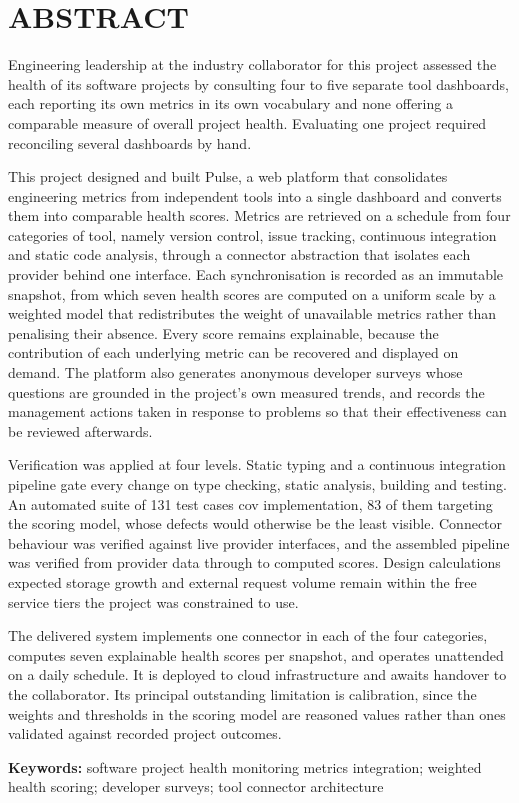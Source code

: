 \chapter*{ABSTRACT}

Engineering leadership at the industry collaborator for this project assessed the
health of its software projects by consulting four to five separate tool
dashboards, each reporting its own metrics in its own vocabulary and none
offering a comparable measure of overall project health. Evaluating one project
required reconciling several dashboards by hand.

This project designed and built Pulse, a web platform that consolidates
engineering metrics from independent tools into a single dashboard and converts
them into comparable health scores. Metrics are retrieved on a schedule from four
categories of tool, namely version control, issue tracking, continuous
integration and static code analysis, through a connector abstraction that
isolates each provider behind one interface. Each synchronisation is recorded as
an immutable snapshot, from which seven health scores are computed on a uniform
scale by a weighted model that redistributes the weight of unavailable metrics
rather than penalising their absence. Every score remains explainable, because
the contribution of each underlying metric can be recovered and displayed on
demand. The platform also generates anonymous developer surveys whose
questions are grounded in the project's own measured trends, and records the
management actions taken in response to problems so that their effectiveness can
be reviewed afterwards.

Verification was applied at four levels. Static typing and a continuous
integration pipeline gate every change on type checking, static analysis,
building and testing. An automated suite of 131 test cases cov
implementation, 83 of them targeting the scoring model, whose defects would
otherwise be the least visible. Connector behaviour was verified
against live provider interfaces, and the assembled pipeline was verified from
provider data through to computed scores. Design calculations
expected storage growth and external request volume remain within the free
service tiers the project was constrained to use.

The delivered system implements one connector in each of the four
categories, computes seven explainable health scores per snapshot, and operates
unattended on a daily schedule. It is deployed to cloud infrastructure and awaits
handover to the collaborator. Its principal outstanding limitation is
calibration, since the weights and thresholds in the scoring model are reasoned
values rather than ones validated against recorded project outcomes.

\vspace{12pt}
\noindent\textbf{Keywords:} software project health monitoring
metrics integration; weighted health scoring; developer surveys;
tool connector architecture
\clearpage 